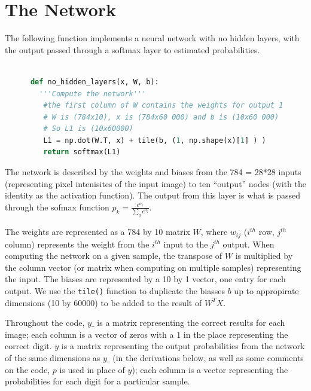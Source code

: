 \documentclass{article}
\begin{document}
   \section{The Network}
   The following function implements a neural network with no hidden layers, with the
   output passed through a softmax layer to estimated probabilities.

   \begin{lstlisting}[language=Python]

      def no_hidden_layers(x, W, b):
   	    '''Compute the network'''
      	 #the first column of W contains the weights for output 1
       	 # W is (784x10), x is (784x60 000) and b is (10x60 000)
       	 # So L1 is (10x60000)
      	 L1 = np.dot(W.T, x) + tile(b, (1, np.shape(x)[1] ) )
     	 return softmax(L1)
   \end{lstlisting}

   The network is described by the weights and biases from the 784 = 28*28 inputs
   (representing pixel intenisites of the input image) to ten ``output'' nodes
   (with the identity as the activation function). The output from this layer is what is
   passed through the sofmax function $p_k = \frac{ e^{o_k} }{ \sum_q e^{o_q}}$.

   The weights are represented as a 784 by 10 matrix $W$, where $w_{ij}$ ($i^{th}$ row, $j^{th}$
   column) represents the weight from the $i^{th}$ input to the $j^{th}$ output.
   When computing the network on a given sample, the transpose of $W$ is multiplied
   by the column vector (or matrix when computing on multiple samples) representing the input.
   The biases are represented by a 10 by 1 vector, one entry for each output. We use the \texttt{tile()} function
   to duplicate the biasses $b$ up to appropirate dimensions (10 by 60000) to be added to the result of $W^T X$.

   Throughout the code, $y\_$ is a matrix representing the correct results for each image; each column is a
   vector of zeros with a 1 in the place representing the correct digit.
   $y$ is a matrix representing the output probabilities from the network of the same dimensions
   as $y\_$ (in the derivations below, as well as some comments on the code, $p$ is used in place of $y$);
   each column is a vector representing the probabilities for each digit for a particular sample.
\end{document}
